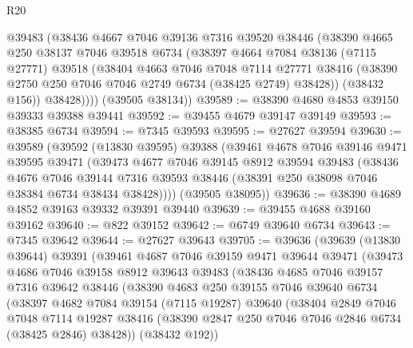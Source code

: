 \begin{lexlean}{R20}
\begin{coremodule}
{          @39483
          (@38436
            @4667
            @7046
            @39136
            @7316
            @39520
            @38446
            (@38390
              @4665
              @250
              @38137
              @7046
              @39518
              @6734
              (@38397
                @4664
                @7084
                @38136
                (@7115 @27771)
                @39518
                (@38404
                  @4663
                  @7046
                  @7048
                  @7114
                  @27771
                  @38416
                  (@38390 @2750 @250 @7046 @7046 @2749 @6734 (@38425 @2749) @38428))
                (@38432 @156))
              @38428))))
      (@39505 @38134))
@39589 := @38390 @4680 @4853 @39150 @39333 @39388 @39441
@39592 := @39455 @4679 @39147 @39149
@39593 := @38385 @6734
@39594 := @7345 @39593
@39595 := @27627 @39594
@39630 := @39589
    (@39592
      (@13830 @39595)
      @39388
      (@39461
        @4678
        @7046
        @39146
        @9471
        @39595
        @39471
        (@39473
          @4677
          @7046
          @39145
          @8912
          @39594
          @39483
          (@38436
            @4676
            @7046
            @39144
            @7316
            @39593
            @38446
            (@38391 @250 @38098 @7046 @38384 @6734 @38434 @38428))))
      (@39505 @38095))
@39636 := @38390 @4689 @4852 @39163 @39332 @39391 @39440
@39639 := @39455 @4688 @39160 @39162
@39640 := @822 @39152
@39642 := @6749 @39640 @6734
@39643 := @7345 @39642
@39644 := @27627 @39643
@39705 := @39636
    (@39639
      (@13830 @39644)
      @39391
      (@39461
        @4687
        @7046
        @39159
        @9471
        @39644
        @39471
        (@39473
          @4686
          @7046
          @39158
          @8912
          @39643
          @39483
          (@38436
            @4685
            @7046
            @39157
            @7316
            @39642
            @38446
            (@38390
              @4683
              @250
              @39155
              @7046
              @39640
              @6734
              (@38397
                @4682
                @7084
                @39154
                (@7115 @19287)
                @39640
                (@38404
                  @2849
                  @7046
                  @7048
                  @7114
                  @19287
                  @38416
                  (@38390 @2847 @250 @7046 @7046 @2846 @6734 (@38425 @2846) @38428))
                (@38432 @192))
}
\end{coremodule}
\end{lexlean}
